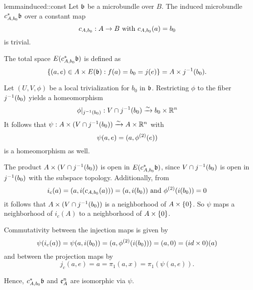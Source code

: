 \begin{mystatement}{lemma}{induced::const}
    Let $\bb$ be a microbundle over $B$.
    The induced microbundle $\ind{c_{A, b_0}}\bb$ over a constant map
    \[ c_{A, b_0}: A \to B \text{ with } c_{A, b_0}(a) = b_0 \]
    is trivial.
\end{mystatement}

\begin{myproof}
    The total space $E(\ind{c_{A, b_0}}\bb)$ is defined as
    \[ \set{(a, e) \in A \cross E(\bb)}{f(a) = b_0 = j(e)} = A \cross \inv{j}(b_0). \]

    Let $(U, V, \phi)$ be a local trivialization for $b_0$ in $\bb$.
    Restricting $\phi$ to the fiber $j^{-1}(b_0)$ yields a homeomorphism
    \[ \phi\vert_{j^{-1}(b_0)}: V \cap j^{-1}(b_0) \xrightarrow{\sim} b_0 \times \mathbb{R}^n \]
    It follows that $\psi: A \times (V \cap j^{-1}(b_0)) \xrightarrow{\sim} A \times \mathbb{R}^n$ with
    \[ \psi(a, e) = (a, \phi^{(2)}(e)) \]
    is a homeomorphism as well.

    The product $A \times (V \cap j^{-1}(b_0))$ is open in $E(\ind{c_{A, b_0}}\bb)$,
    since  $V \cap j^{-1}(b_0)$ is open in $j^{-1}(b_0)$ with the subspace topology.
    Additionally, from
    \[ i_{c}(a) = (a, i(c_{A, b_0}(a))) = (a, i(b_0)) \text{ and } \phi^{(2)}(i(b_0)) = 0 \]
    it follows that $A \times (V \cap j^{-1}(b_0))$ is a neighborhood of $A \times{} \{0\}$.
    So $\psi$ maps a neighborhood of $i_c(A)$
    to a neighborhood of $A \times{} \{0\}$.
    
    Commutativity between the injection maps is given by
    \[ \psi(i_c(a)) = \psi(a, i(b_0)) = (a, \phi^{(2)}(i(b_0))) = (a, 0) = (id \times 0)(a) \]
    and between the projection maps by
    \[ j_c(a, e) = a = \pi_1(a, x) = \pi_1(\psi(a, e)). \]

    Hence, $\ind{c_{A, b_0}}\bb$ and $\mathfrak{e}^{n}_{A}$ are isomorphic via $\psi$. 
\end{myproof}